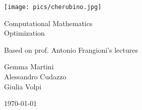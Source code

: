 \documentclass[computational_mathematics.tex]{subfiles}
\begin{document}
\begin{titlepage}
    \begin{center}
    \vspace{3cm}
    
    \Large
    
    \vspace{2cm}
    
    \texttt{[image: pics/cherubino.jpg]}
    
    \vspace{2.5cm}
    
    {\Huge \sc Computational Mathematics\\ Optimization}
    
    \vspace{2cm}
    Based on prof. Antonio Frangioni's lectures
    
    \vspace{2cm}
    Gemma Martini\\ Alessandro Cudazzo\\ Giulia Volpi
    \vfill
    
    \today
    
    \end{center}
\end{titlepage}

\shipout\null

\tableofcontents
\let\tableofcontents\relax
\shipout\null

\newpage



\newpage



\newpage



\newpage



\newpage



\newpage



\newpage



\newpage



\newpage



\newpage
\end{document}
